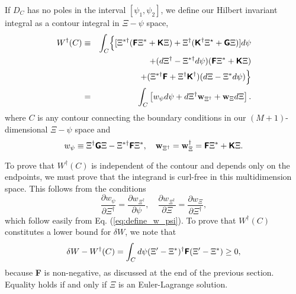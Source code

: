 \documentclass[prb,twocolumn,showpacs,preprintnumbers,amsmath,amssymb]{revtex4}
\renewcommand*{\v}[1]{\hbox{\bfseries #1}}
\renewcommand*{\t}[1]{\hbox{\sffamily\bfseries #1}}
\begin{document}
If $D_C$ has no poles in the interval $[\psi_1,\psi_2]$, we define our
Hilbert invariant integral as a contour integral in $\Xi-\psi$ space,
\begin{eqnarray}
W^\dagger(C) \equiv&& \int_C  \Bigl\{
	[\Xi^{*\dagger} (\t{F} \Xi^* + \t{K} \Xi)
	+ \Xi^\dagger (\t{K}^\dagger \Xi^\star + \t{G} \Xi) ] d\psi 
	\nonumber \\
&&+ (d\Xi^\dagger - \Xi^{*\dagger} d\psi) 
	(\t{F} \Xi^* + \t{K} \Xi) \nonumber \\
&&+ (\Xi^{*\dagger} \t{F} + \Xi^\dagger \t{K}^\dagger) 
	(d\Xi - \Xi^* d\psi) \Bigr\} \nonumber \\
=&& \int_C \left[ w_\psi d\psi 
	+ d\Xi^\dagger \v{w}_{\Xi^\dagger} 
	+ \v{w}_\Xi d\Xi \right].
\label{eq:define_w_dagger}
\end{eqnarray}
where $C$ is any contour connecting the boundary conditions in our
$(M+1)$-dimensional $\Xi-\psi$ space and
\begin{equation}
w_\psi \equiv \Xi^\dagger \t{G} \Xi - \Xi^{* \dagger} \t{F} \Xi^*, \quad
\v{w}_{\Xi^\dagger} = \v{w}_\Xi^\dagger = \t{F} \Xi^* + \t{K} \Xi.
\label{eq:define_w_psi}
\end{equation}

To prove that $W^\dagger(C)$ is independent of the contour and depends
only on the endpoints, we must prove that the integrand is curl-free in
this multidimension space.  This follows from the conditions
\[
\frac{\partial w_\psi}{\partial \Xi^\dagger} 
= \frac{\partial w_{\Xi^\dagger}}{\partial \psi}, \quad
\frac{\partial w_{\Xi^\dagger}}{\partial \Xi}
= \frac{\partial w_\Xi}{\partial \Xi^\dagger},
\]
which follow easily from Eq. (\ref{eq:define_w_psi}).  To prove that
$W^\dagger(C)$ constitutes a lower bound for $\delta W$, we note that
\[
\delta W - W^\dagger(C) = \int_C d\psi (\Xi' - \Xi^*)^\dagger \t{F}
	(\Xi' - \Xi^*) \ge 0,
\]
because \t{F} is non-negative, as discussed at the end of the previous
section.  Equality holds if and only if $\Xi$ is an Euler-Lagrange
solution.
\end{document}
